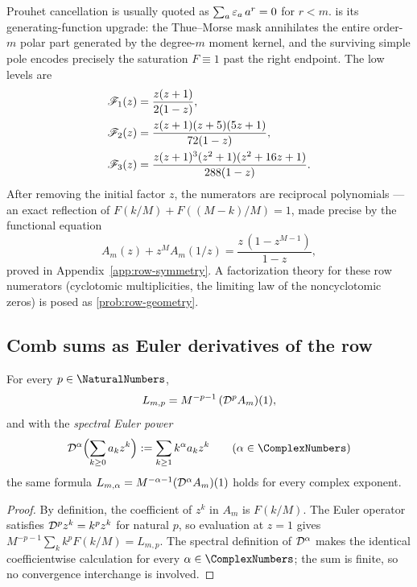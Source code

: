 \begin{remark}
Prouhet cancellation is usually quoted as
$\sum_a\varepsilon_a\,a^{r}=0$ for $r<m$.   is its
generating-function upgrade: the Thue--Morse mask annihilates the
entire order-$m$ polar part generated by the degree-$m$ moment kernel,
and the surviving simple pole encodes precisely the saturation
$F\equiv1$ past the right endpoint.  The low levels are
\begin{align}
 \mathscr F_1(z)&=\frac{z(z+1)}{2(1-z)},
 \label{eq:row-N1}\\
 \mathscr F_2(z)&=\frac{z(z+1)(z+5)(5z+1)}{72(1-z)},
 \label{eq:row-N2}\\
 \mathscr F_3(z)&=\frac{z(z+1)^{3}(z^{2}+1)(z^{2}+16z+1)}{288(1-z)}.
 \label{eq:row-N3}
\end{align}
After removing the initial factor $z$, the numerators are reciprocal
polynomials --- an exact reflection of $F(k/M)+F((M-k)/M)=1$, made
precise by the functional equation
\begin{equation}
 A_m(z)+z^{M}A_m(1/z)
 =\frac{z\,(1-z^{M-1})}{1-z},
 \label{eq:AN-reciprocal}
\end{equation}
proved in Appendix~\ref{app:row-symmetry}.  A factorization theory for these
row numerators (cyclotomic multiplicities, the limiting law of the
noncyclotomic zeros) is posed as \cref{prob:row-geometry}.
\end{remark}

\subsection{Comb sums as Euler derivatives of the row}

\begin{corollary}
\label{cor:euler-powers}
For every $p\in\NaturalNumbers$,
\begin{equation}
 L_{m,p}=M^{-p-1}\,(\mathcal D^{p}A_m)(1),
 \label{eq:euler-natural}
\end{equation}
and with the \emph{spectral Euler power}
\begin{equation}
 \Dop^{\alpha}\Bigl(\sum_{k\ge0}a_kz^{k}\Bigr)
 :=\sum_{k\ge1}k^{\alpha}a_kz^{k}
 \qquad(\alpha\in\ComplexNumbers)
\label{eq:fractional-Euler}
\end{equation}
the same formula
$L_{m,\alpha}=M^{-\alpha-1}(\mathcal D^{\alpha}A_m)(1)$ holds for every
complex exponent.
\end{corollary}

\begin{proof}
By definition, the coefficient of $z^k$ in $A_m$ is $F(k/M)$.
The Euler operator satisfies $\mathcal D^p z^k=k^p z^k$ for natural $p$,
so evaluation at $z=1$ gives
$M^{-p-1}\sum_k k^pF(k/M)=L_{m,p}$.  The spectral definition of
$\mathcal D^\alpha$ makes the identical coefficientwise calculation for every
$\alpha\in\ComplexNumbers$; the sum is finite, so no convergence
interchange is involved.
\end{proof}

